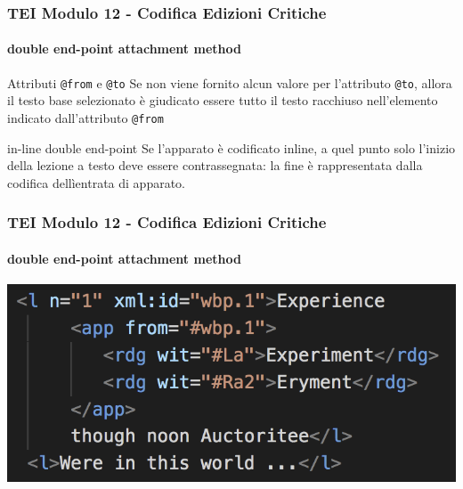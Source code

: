 \begin{frame}
    \frametitle{TEI Modulo 12 - Codifica Edizioni Critiche}
    \framesubtitle{double end-point attachment method}
    \addtocounter{nframe}{1}
    


   

    \begin{block}{Attributi \texttt{@from} e \texttt{@to}}
      Se non viene fornito alcun valore per l'attributo \texttt{@to}, allora il testo base selezionato è giudicato essere tutto il testo racchiuso nell'elemento indicato dall'attributo \texttt{@from}
    \end{block}
    
    \begin{block}{in-line double end-point}
       Se l'apparato è codificato inline, a quel punto solo l'inizio della lezione a testo deve essere contrassegnata: la fine è rappresentata dalla codifica dellìentrata di apparato.
    \end{block}

\end{frame}

\begin{frame}
    \frametitle{TEI Modulo 12 - Codifica Edizioni Critiche}
    \framesubtitle{double end-point attachment method}
    \addtocounter{nframe}{1}
    
   
    \begin{center}
       \includegraphics[width=.95\textwidth]{imgs/inline-double-end-point.png}
    \end{center}

\end{frame}


